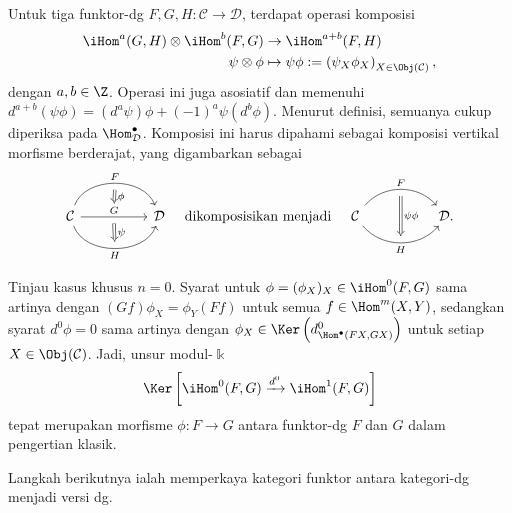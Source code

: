 Untuk tiga funktor-dg $F,G,H:\mathcal{C}\to\mathcal{D}$, terdapat operasi
komposisi
\begin{equation}\label{eqn:dgfct-iHom}\begin{aligned}
	\iHom^a(G, H) \otimes \iHom^b(F, G) & \to \iHom^{a+b}(F, H) \\
	\psi \otimes \phi & \mapsto \psi\phi := \left( \psi_X \phi_X \right)_{X \in \Obj(\mathcal{C})},
\end{aligned}\end{equation}
dengan $a,b\in\Z$. Operasi ini juga asosiatif dan memenuhi
$d^{a+b}(\psi\phi)=(d^a\psi)\phi+(-1)^a\psi(d^b\phi)$. Menurut definisi,
	semuanya cukup diperiksa pada
$\Hom^\bullet_{\mathcal{D}}$. Komposisi ini harus dipahami sebagai komposisi
vertikal morfisme berderajat, yang digambarkan sebagai
\[\begin{tikzcd}
	\mathcal{C}
	\arrow[bend left=70, rr, "F", ""' name=U]
	\arrow[rr, "G" name=MM, ""' name=M]
	\arrow[bend right=70, rr, "" name=D, "H"'] & &
	\arrow[Rightarrow, to path=(U) -- (MM) \tikztonodes, "\phi"] \arrow[Rightarrow, to path=(M) -- (D) \tikztonodes, "\psi"] \mathcal{D}
\end{tikzcd}  \quad \text{dikomposisikan menjadi} \quad \begin{tikzcd}
	\mathcal{C}
	\arrow[bend left=50, rr, "F", ""' name=U]
	\arrow[bend right=50, rr, "" name=D, "H"']
	& & \arrow[Rightarrow, to path=(U) -- (D) \tikztonodes, "\psi \phi"] \mathcal{D} .
\end{tikzcd}\]

Tinjau kasus khusus $n=0$. Syarat untuk
$\phi=(\phi_X)_X\in\iHom^0(F,G)$ sama artinya dengan
$(Gf)\phi_X=\phi_Y(Ff)$ untuk semua $f\in\Hom^m(X,Y)$, sedangkan syarat
$d^0\phi=0$ sama artinya dengan
$\phi_X\in\Ker\left(d^0_{\Hom^\bullet(FX,GX)}\right)$ untuk setiap
	$X\in\Obj(\mathcal{C})$. Jadi, unsur modul-$\Bbbk$
\[ \Ker\left[ \iHom^0(F, G) \xrightarrow{d^0} \iHom^1(F, G) \right] \]
tepat merupakan morfisme $\phi:F\to G$ antara funktor-dg $F$ dan $G$ dalam
pengertian klasik.

Langkah berikutnya ialah memperkaya kategori funktor antara kategori-dg
menjadi versi dg.


